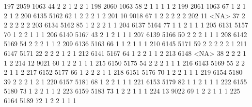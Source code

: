 \documentclass[
  letterpaper,
  DIV=11,
  numbers=noendperiod]{scrreprt}
\newenvironment{Shaded}{\begin{snugshade}}{\end{snugshade}}
\newcommand{\NormalTok}[1]{\textcolor[rgb]{0.00,0.23,0.31}{#1}}
\begin{document}
\begin{Shaded}
\begin{Highlighting}[]
\NormalTok{197 2059 1063  44          2      2        1         2    2                 1}
\NormalTok{198 2060 1063  58          2      1        1         1    1                 2}
\NormalTok{199 2061 1063  67          1      2        1         2    1                 2}
\NormalTok{200 6135 5162  62          1      2        2         2    1                 2}
\NormalTok{201   10 9018  67          1      2        2         2    2                 2}
\NormalTok{202   11 \textless{}NA\textgreater{}  37          2      2        2         2    2                 2}
\NormalTok{203 6134 5162  85          1      2        2         2    1                 1}
\NormalTok{204 6137 5164  77          1      1        2         1    1                 1}
\NormalTok{205 6131 5157  70          1      2        2         1    1                 1}
\NormalTok{206 6140 5167  43          2      1        2         1    1                 1}
\NormalTok{207 6139 5166  50          2      2        2         1    1                 1}
\NormalTok{208 6142 5169  54          2      2        2         1    1                 2}
\NormalTok{209 6136 5163  66          1      1        2         1    1                 1}
\NormalTok{210 6145 5171  59          2      2        2         2    2                 1}
\NormalTok{211 6147 5171  22          2      2        2         1    2                 1}
\NormalTok{212 6141 5167  64          1      2        2         1    1                 2}
\NormalTok{213 6148 \textless{}NA\textgreater{}  38          2      2        2         1    1                 2}
\NormalTok{214   12 9021  60          1      2        2         1    1                 1}
\NormalTok{215 6150 5175  54          2      2        2         1    1                 1}
\NormalTok{216 6143 5169  55          2      2        2         1    1                 2}
\NormalTok{217 6152 5177  66          1      2        2         2    1                 1}
\NormalTok{218 6151 5176  70          1      2        2         1    1                 1}
\NormalTok{219 6154 5180  39          2      2        2         1    2                 1}
\NormalTok{220 6157 5181  68          1      2        2         1    1                 1}
\NormalTok{221 6153 5179  82          1      1        2         1    1                 1}
\NormalTok{222 6155 5180  73          1      2        2         1    1                 2}
\NormalTok{223 6159 5183  73          1      2        2         1    1                 1}
\NormalTok{224   13 9022  69          1      2        2         1    1                 1}
\NormalTok{225 6164 5189  72          1      2        2         1    1                 1}

\end{Highlighting}
\end{Shaded}
\end{document}
